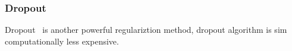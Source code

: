 \subsubsection{Dropout}

Dropout~\cite{JMLR:v15:srivastava14a} is another powerful regulariztion method, dropout algorithm is sim computationally less expensive. 